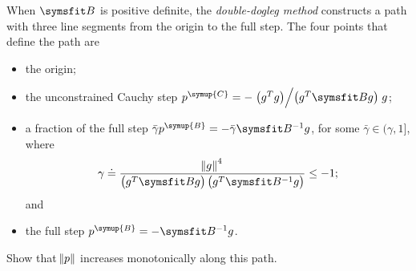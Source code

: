 \documentclass{assignment}[2019/10/15]
\newcommand{\B}{\matr{B}}
\newcommand{\Bi}{\matr{B}^{-1}}
\newcommand{\pC}{p^{\symup{C}}}
\newcommand{\pB}{p^{\symup{B}}}
\begin{document}
    \begin{problem}
        When $\B$ is positive definite, the {\itshape double-dogleg method} constructs a path with three line segments from the origin to the full step. The four points that define the path are
        \begin{itemize}
            \item the origin;
            \item the unconstrained Cauchy step $\pC=-\left.\left(g^Tg\right)\middle/\left(g^T\B g\right)\right.g$;
            \item a fraction of the full step $\bar{\gamma}\pB=-\bar{\gamma}\Bi g$, for some $\bar{\gamma}\in(\gamma, 1]$, where
            \begin{equation}
                \gamma \doteq \frac{\norm{g}^4}{\left(g^T\B g\right)\left(g^T\Bi g\right)}\leq -1;
            \end{equation}
            and
            \item the full step $\pB = -\Bi g$.
        \end{itemize}
        Show that $\norm{p}$ increases monotonically along this path.
    \end{problem}
\end{document}
